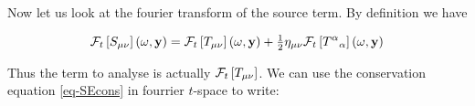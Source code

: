 \documentclass[
  letterpaper,
  DIV=11,
  numbers=noendperiod,
  oneside]{scrreprt}
\begin{document}
Now let us look at the fourier transform of the source term. By
definition we have

\[
\mathtip{\mathcal{F}_{t}\left[\texttip{\texttip{S}{source tensor}_{\mu\nu}}{covariant source tensor component}\right]}{\text{Fourier transform of $\texttip{\texttip{S}{source tensor}_{\mu\nu}}{covariant source tensor component}$ in variable $t$: }{\mathcal{F}_{t}\left[\texttip{\texttip{S}{source tensor}_{\mu\nu}}{covariant source tensor component}\right] = \int \,\mathrm{d}^{}t\, \texttip{\texttip{S}{source tensor}_{\mu\nu}}{covariant source tensor component}(t) \oldexp{\mathtip{{\mathring{\imath}}}{\text{Complex unit: } {\mathring{\imath}}^2 = -1}\omega \cdot t}   }}(\omega,\mathbf{y})=\mathtip{\mathcal{F}_{t}\left[\texttip{\texttip{T}{Stress-Energy tensor, or energy-momentum tensor}_{{\mu\nu}}}{covariant Stress-Energy tensor component}\right]}{\text{Fourier transform of $\texttip{\texttip{T}{Stress-Energy tensor, or energy-momentum tensor}_{{\mu\nu}}}{covariant Stress-Energy tensor component}$ in variable $t$: }{\mathcal{F}_{t}\left[\texttip{\texttip{T}{Stress-Energy tensor, or energy-momentum tensor}_{{\mu\nu}}}{covariant Stress-Energy tensor component}\right] = \int \,\mathrm{d}^{}t\, \texttip{\texttip{T}{Stress-Energy tensor, or energy-momentum tensor}_{{\mu\nu}}}{covariant Stress-Energy tensor component}(t) \oldexp{\mathtip{{\mathring{\imath}}}{\text{Complex unit: } {\mathring{\imath}}^2 = -1}\omega \cdot t}   }}(\omega,\mathbf{y})+\tfrac{1}{2}\texttip{\texttip{\eta}{Minkoski metric tensor +---}_{{\mu\nu}}}{covariant Minkoski metric components +---}\mathtip{\mathcal{F}_{t}\left[\texttip{\texttip{T}{Stress-Energy tensor, or energy-momentum tensor}^{\alpha}{}_{\alpha}}{Stress-Energy tensor trace}\right]}{\text{Fourier transform of $\texttip{\texttip{T}{Stress-Energy tensor, or energy-momentum tensor}^{\alpha}{}_{\alpha}}{Stress-Energy tensor trace}$ in variable $t$: }{\mathcal{F}_{t}\left[\texttip{\texttip{T}{Stress-Energy tensor, or energy-momentum tensor}^{\alpha}{}_{\alpha}}{Stress-Energy tensor trace}\right] = \int \,\mathrm{d}^{}t\, \texttip{\texttip{T}{Stress-Energy tensor, or energy-momentum tensor}^{\alpha}{}_{\alpha}}{Stress-Energy tensor trace}(t) \oldexp{\mathtip{{\mathring{\imath}}}{\text{Complex unit: } {\mathring{\imath}}^2 = -1}\omega \cdot t}   }}(\omega,\mathbf{y})
\]

Thus the term to analyse is actually
\(\mathtip{\mathcal{F}_{t}\left[\texttip{\texttip{T}{Stress-Energy tensor, or energy-momentum tensor}_{{\mu\nu}}}{covariant Stress-Energy tensor component}\right]}{\text{Fourier transform of $\texttip{\texttip{T}{Stress-Energy tensor, or energy-momentum tensor}_{{\mu\nu}}}{covariant Stress-Energy tensor component}$ in variable $t$: }{\mathcal{F}_{t}\left[\texttip{\texttip{T}{Stress-Energy tensor, or energy-momentum tensor}_{{\mu\nu}}}{covariant Stress-Energy tensor component}\right] = \int \,\mathrm{d}^{}t\, \texttip{\texttip{T}{Stress-Energy tensor, or energy-momentum tensor}_{{\mu\nu}}}{covariant Stress-Energy tensor component}(t) \oldexp{\mathtip{{\mathring{\imath}}}{\text{Complex unit: } {\mathring{\imath}}^2 = -1}\omega \cdot t}   }}\).
We can use the conservation equation \ref{eq-SEcons} in fourrier
\(t\)-space to write:
\end{document}

